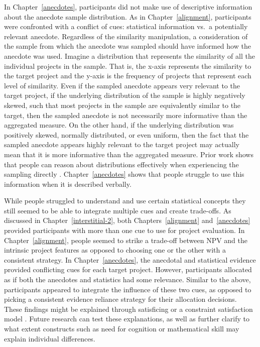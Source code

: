 \documentclass[a4paper, nobind, dvipsnames]{templates/ociamthesis}
\theoremstyle{definition}
\theoremstyle{definition}
\theoremstyle{definition}
\theoremstyle{definition}
\theoremstyle{remark}
\begin{document}
In Chapter~\ref{anecdotes}, participants did not make use of descriptive
information about the anecdote sample distribution. As in
Chapter~\ref{alignment}, participants were confronted with a conflict of cues:
statistical information vs.~a potentially relevant anecdote. Regardless of the
similarity manipulation, a consideration of the sample from which the anecdote
was sampled should have informed how the anecdote was used. Imagine a
distribution that represents the similarity of all the individual projects in
the sample. That is, the x-axis represents the similarity to the target project
and the y-axis is the frequency of projects that represent each level of
similarity. Even if the sampled anecdote appears very relevant to the target
project, if the underlying distribution of the sample is highly negatively
skewed, such that most projects in the sample are equivalently similar to the
target, then the sampled anecdote is not necessarily more informative than the
aggregated measure. On the other hand, if the underlying distribution was
positively skewed, normally distributed, or even uniform, then the fact that the
sampled anecdote appears highly relevant to the target project may actually mean
that it is more informative than the aggregated measure. Prior work shows that
people can reason about distributions effectively when experiencing the sampling
directly \autocites[e.g.,][]{hertwig2004,carvalho2021}. Chapter~\ref{anecdotes} shows
that people struggle to use this information when it is described verbally.

While people struggled to understand and use certain statistical concepts they
still seemed to be able to integrate multiple cues and create trade-offs. As
discussed in Chapter~\ref{interstitial-2}, both Chapters~\ref{alignment}
and~\ref{anecdotes} provided participants with more than one cue to use for
project evaluation. In Chapter~\ref{alignment}, people seemed to strike a
trade-off between NPV and the intrinsic project features as opposed to choosing
one or the other with a consistent strategy. In Chapter~\ref{anecdotes}, the
anecdotal and statistical evidence provided conflicting cues for each target
project. However, participants allocated as if both the anecdotes and statistics
had some relevance. Similar to the above, participants appeared to integrate the
influence of these two cues, as opposed to picking a consistent evidence
reliance strategy for their allocation decisions. These findings might be
explained through satisficing \autocite{simon1955} or a constraint satisfaction model
\autocite[e.g.,][]{glockner2014}. Future research can test these explanations, as well as
further clarify to what extent constructs such as need for cognition or
mathematical skill may explain individual differences.
\end{document}
